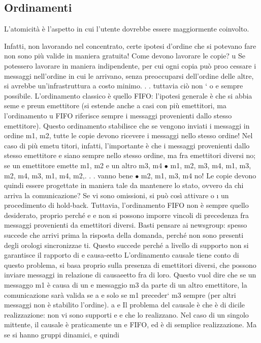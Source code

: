 \documentclass[a4paper,12pt]{article}
\begin{document}
\subsection{Ordinamenti}
L'atomicità è l'aspetto in cui l'utente dovrebbe essere maggiormente coinvolto.

Infatti, non lavorando nel concentrato, certe ipotesi d'ordine che si potevano
fare non sono più valide in maniera gratuita! Come devono lavorare le copie?
u
Se potessero lavorare in maniera indipendente, per cui ogni copia può proo
cessare i messaggi nell'ordine in cui le arrivano, senza preoccuparsi dell'ordine
delle altre, si avrebbe un'infrastruttura a costo minimo. . . tuttavia ciò non `
o
e
sempre possibile.
L'ordinamento classico è quello FIFO: l'ipotesi generale è che si abbia seme
e
preun emettitore (si estende anche a casi con più emettitori, ma l'ordinamento
u
FIFO riferisce sempre i messaggi provenienti dallo stesso emettitore). Questo
ordinamento stabilisce che se vengono inviati i messaggi in ordine m1, m2, tutte
le copie devono ricevere i messaggi nello stesso ordine! Nel caso di più emetu
titori, infatti, l'importante è che i messaggi provenienti dallo stesso emettitore
e
siano sempre nello stesso ordine, ma fra emettitori diversi no; se un emettitore
emette m1, m2 e un altro m3, m4
$\bullet$ m1, m2, m3, m4, m1, m3, m2, m4, m3, m1, m4, m2,. . . vanno bene
$\bullet$ m2, m1, m3, m4 no!
Le copie devono quindi essere progettate in maniera tale da mantenere lo stato,
ovvero da chi arriva la comunicazione? Se vi sono omissioni, si può così attivare
o
\i{}
un procedimento di hold-back.
Tuttavia, l'ordinamento FIFO non è sempre quello desiderato, proprio perché
e
e
non si possono imporre vincoli di precedenza fra messaggi provenienti da emettitori diversi. Basti pensare ai newsgroup:
spesso succede che arrivi prima
la risposta della domanda, perché non sono presenti degli orologi sincronizzae
ti. Questo succede perché a livello di supporto non si garantisce il rapporto di
e
causa-eetto
L'ordinamento causale tiene conto di questo problema, si basa proprio sulla
presenza di emettitori diversi, che possono inviare messaggi in relazione di causaeetto fra di loro. Questo vuol dire
che se un messaggo m1 è causa di un
e
messaggio m3 da parte di un altro emettitore, la comunicazione sarà valida se
a
e solo se m1 preceder` m3 sempre (per altri messaggi non è stabilito l'ordine).
a
e
Il problema del causale è che è di dicile realizzazione: non vi sono supporti
e
e
che lo realizzano. Nel caso di un singolo mittente, il causale è praticamente un
e
FIFO, ed è di semplice realizzazione. Ma se si hanno gruppi dinamici, e quindi
\end{document}

